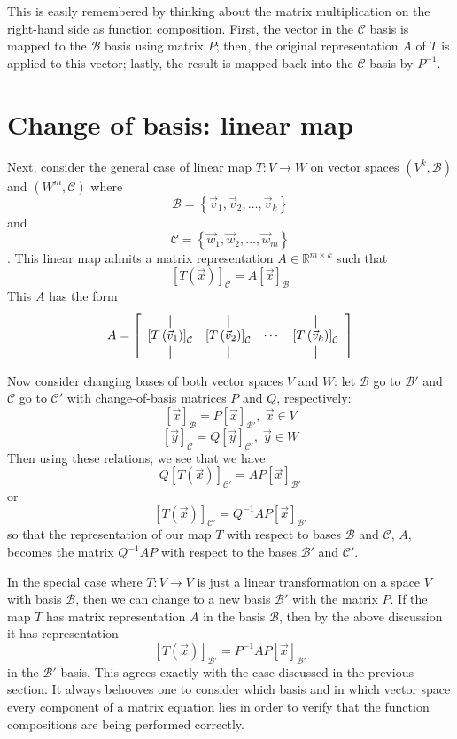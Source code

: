 This is easily remembered by thinking about the matrix multiplication on the right-hand side as function composition. First, the vector in the $\mathcal{C}$ basis is mapped to the $\mathcal{B}$ basis using matrix $P$; then, the original representation $A$ of $T$ is applied to this vector; lastly, the result is mapped back into the $\mathcal{C}$ basis by $P^{-1}$.



\section{Change of basis: linear map}
Next, consider the general case of linear map $T: V \rightarrow W$ on vector spaces $\left(V^k,\mathcal{B}\right)$ and $\left(W^m, \mathcal{C}\right)$ where \[\mathcal{B} = \left\{ \vec{v}_1, \vec{v}_2, \ldots, \vec{v}_k\right\} \] and \[ \mathcal{C} = \left\{ \vec{w}_1, \vec{w}_2, \ldots, \vec{w}_m\right\} \]. This linear map admits a matrix representation $A \in \mathbb{R}^{m \times k}$ such that \[ \left[T\left(\vec{x}\right) \right]_{\mathcal{C}} = A \left[\vec{x}\right]_{\mathcal{B}} \] This $A$ has the form \[ A = \left[ \begin{array}{cccc} \vertbar & \vertbar & & \vertbar \\
\left[ T\left( \vec{v}_1\right) \right]_{\mathcal{C}} & \left[T\left(\vec{v}_2\right) \right]_{\mathcal{C}} & \cdots & \left[T\left(\vec{v}_k\right)\right]_{\mathcal{C}} \\ \vertbar & \vertbar & & \vertbar \end{array} \right] \]

Now consider changing bases of both vector spaces $V$ and $W$: let $\mathcal{B}$ go to $\mathcal{B}'$ and $\mathcal{C}$ go to $\mathcal{C}'$ with change-of-basis matrices $P$ and $Q$, respectively: 
\[ \left[ \vec{x} \right]_{\mathcal{B}} = P \left[ \vec{x} \right]_{\mathcal{B}'}, \; \vec{x} \in V  \]
\[ \left[ \vec{y} \right]_{\mathcal{C}} = Q \left[ \vec{y} \right]_{\mathcal{C}'}, \; \vec{y} \in W  \] Then using these relations, we see that we have
\[ Q \left[ T\left(\vec{x}\right) \right]_{\mathcal{C}'}  = AP\left[ \vec{x} \right]_{\mathcal{B}'} \]  or \[ \left[ T\left(\vec{x}\right) \right]_{\mathcal{C}'}  = Q^{-1} AP\left[ \vec{x} \right]_{\mathcal{B}'} \] so that the representation of our map $T$ with respect to bases $\mathcal{B}$ and $\mathcal{C}$, $A$, becomes the matrix $Q^{-1}AP$ with respect to the bases $\mathcal{B}'$ and $\mathcal{C}'$.

In the special case where $T:V\rightarrow V$ is just a linear transformation on a space $V$ with basis $\mathcal{B}$, then we can change to a new basis $\mathcal{B}'$ with the matrix $P$. If the map $T$ has matrix representation $A$ in the basis $\mathcal{B}$, then by the above discussion it has representation \[ \left[T\left(\vec{x}\right)\right]_{\mathcal{B}'} = P^{-1}AP \left[ \vec{x}\right]_{\mathcal{B}'} \] in the $\mathcal{B}'$ basis. This agrees exactly with the case discussed in the previous section. It always behooves one to consider which basis and in which vector space every component of a matrix equation lies in order to verify that the function compositions are being performed correctly.




